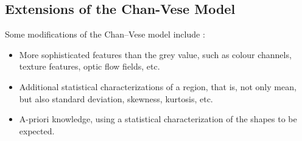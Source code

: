 \documentclass[journal]{IEEEtran}
\begin{document}
\subsection{Extensions of the Chan-Vese Model}


Some modifications of the Chan--Vese model include \cite{Pascal2023}:
\begin{itemize}
    \item More sophisticated features than the grey value, such as colour channels, texture features, optic flow fields, etc.
    \item Additional statistical characterizations of a region, that is, not only mean, but also standard deviation, skewness, kurtosis, etc.
    \item A-priori knowledge, using a statistical characterization of the shapes to be expected.
\end{itemize}
\end{document}
